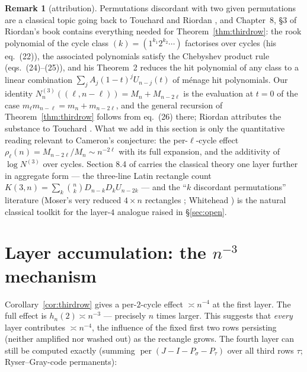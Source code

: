 \documentclass[11pt]{article}
\theoremstyle{definition}
\newtheorem{remark}[theorem]{Remark}
\DeclareMathOperator{\per}{per}
\begin{document}
\begin{remark}[attribution]\label{rem:attribution}
Permutations discordant with two given permutations are a classical topic
going back to Touchard \cite{Touchard53} and Riordan \cite{Riordan54}, and
Chapter~8, \S3 of Riordan's book \cite{Riordan58} contains everything needed
for Theorem~\ref{thm:thirdrow}: the rook polynomial of the cycle class
$(k)=(1^{k_1}2^{k_2}\cdots)$ factorises over cycles (his eq.~(22)), the
associated polynomials satisfy the Chebyshev product rule (eqs.~(24)--(25)),
and his Theorem~2 reduces the hit polynomial of any class to a linear
combination $\sum_jA_j(1-t)^jU_{n-j}(t)$ of m\'enage hit polynomials.
Our identity $N^{(3)}_n((\ell,n-\ell))=M_n+M_{n-2\ell}$ is the evaluation at
$t=0$ of the case $m_\ell m_{n-\ell}=m_n+m_{n-2\ell}$, and the general
recursion of Theorem~\ref{thm:thirdrow} follows from eq.~(26) there; Riordan
attributes the substance to Touchard \cite{Touchard53}.  What we add in this
section is only the quantitative reading relevant to Cameron's conjecture:
the per-$\ell$-cycle effect $\rho_\ell(n)=M_{n-2\ell}/M_n\sim n^{-2\ell}$
with its full expansion, and the additivity of $\log N^{(3)}$ over cycles.
Section 8.4 of \cite{Riordan58} carries the classical theory one layer
further in aggregate form --- the three-line Latin rectangle count
$K(3,n)=\sum_k\binom nkD_{n-k}D_kU_{n-2k}$ --- and the ``$k$ discordant
permutations'' literature (Moser's very reduced $4\times n$ rectangles
\cite{Moser67}; Whitehead \cite{Whitehead79}) is the natural classical
toolkit for the layer-$4$ analogue raised in \S\ref{sec:open}.
\end{remark}

\section{Layer accumulation: the \texorpdfstring{$n^{-3}$}{n\^{}-3} mechanism}\label{sec:layers}

Corollary~\ref{cor:thirdrow} gives a per-$2$-cycle effect $\asymp n^{-4}$ at
the first layer.  The full effect is $h_n(2)\asymp n^{-3}$ --- precisely $n$
times larger.  This suggests that \emph{every} layer contributes
$\asymp n^{-4}$, the influence of the fixed first two rows persisting
(neither amplified nor washed out) as the rectangle grows.  The fourth layer
can still be computed exactly (summing $\per(J-I-P_\sigma-P_\tau)$ over all
third rows $\tau$; Ryser--Gray-code permanents):
\end{document}
